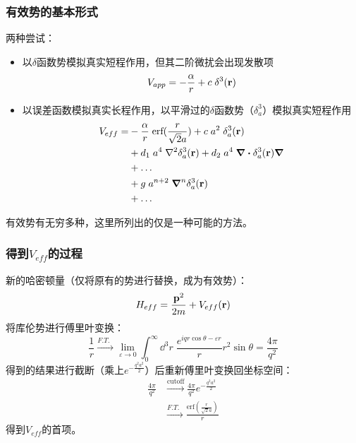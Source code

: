 \documentclass[8pt]{beamer}
\begin{document}
\begin{frame}
\frametitle{有效势的基本形式}
两种尝试：
\begin{itemize}
\item 以$\delta$函数势模拟真实短程作用，但其二阶微扰会出现发散项
\begin{equation}
	V_{app}=-\frac{\alpha}{r}+c\;\delta^3(\vb{r})
\end{equation}
\item 以误差函数模拟真实长程作用，以平滑过的$\delta$函数势（$\delta_a^3$）模拟真实短程作用
\begin{align}\label{Veff}
	\nonumber V_{eff} = & -\frac{\alpha}{r}\;\text{erf}(\frac{r}{\sqrt{2}a})+c\; a^2\;\delta_a^3(\vb{r})    \\
	\nonumber           & +d_1\;a^4\;\laplacian{\delta_a^3(\vb{r})}+d_2\;a^4\;\div{\delta_a^3(\vb{r})}\grad \\
	\nonumber           & +\dots                                                                            \\
	\nonumber           & +g\;a^{n+2}\;\grad^n\delta_a^3(\vb{r})                                            \\
	                    & +\dots
\end{align}
\end{itemize}
有效势有无穷多种，这里所列出的仅是一种可能的方法。
\end{frame}

\begin{frame}
\frametitle{得到$V_{eff}$的过程}
新的哈密顿量（仅将原有的势进行替换，成为有效势）：
\begin{equation}
	H_{eff}=\frac{\vb{p}^2}{2m}+V_{eff}(\vb{r})
\end{equation}
将库伦势进行傅里叶变换：
\begin{equation*}
	\frac{1}{r}\xrightarrow{F.T.\;\;}\lim_{\varepsilon\rightarrow0}\int_{0}^{\infty}\dd^3r\;\frac{e^{iqr\cos\theta-\varepsilon r}}{r}r^2\sin\theta=\frac{4\pi}{q^2}
\end{equation*}
得到的结果进行截断（乘上$e^{-\frac{q^2a^2}{2}}$）后重新傅里叶变换回坐标空间：
\begin{align*}
	\frac{4\pi}{q^2} & \xrightarrow{\text{cutoff}}\frac{4\pi}{q^2}e^{-\frac{q^2a^2}{2}} \\
	                 & \xrightarrow{F.T.\;\;}\frac{\text{erf}(\frac{r}{\sqrt{2}a})}{r}
\end{align*}
得到$V_{eff}$的首项。
\end{frame}
\end{document}

